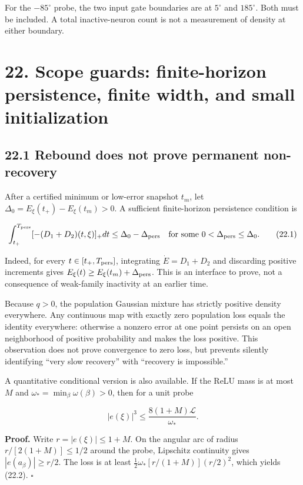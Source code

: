 \documentclass[
  10pt,
]{article}
\begin{document}
For the \(-85^\circ\) probe, the two input gate boundaries are at
\(5^\circ\) and \(185^\circ\). Both must be included. A total
inactive-neuron count is not a measurement of density at either
boundary.

\section{22. Scope guards: finite-horizon persistence, finite width, and
small
initialization}\label{scope-guards-finite-horizon-persistence-finite-width-and-small-initialization}

\subsection{22.1 Rebound does not prove permanent
non-recovery}\label{rebound-does-not-prove-permanent-non-recovery}

After a certified minimum or low-error snapshot \(t_m\), let
\(\Delta_0=E_\xi(t_+)-E_\xi(t_m)>0\). A sufficient finite-horizon
persistence condition is

\[
 \int_{t_+}^{T_{\rm pers}}[-(D_1+D_2)(t,\xi)]_+dt
 \le\Delta_0-\Delta_{\rm pers}
 \quad\text{for some }0<\Delta_{\rm pers}\le\Delta_0.
 \tag{22.1}
\]

Indeed, for every \(t\in[t_+,T_{\rm pers}]\), integrating
\(\dot E=D_1+D_2\) and discarding positive increments gives
\(E_\xi(t)\ge E_\xi(t_m)+\Delta_{\rm pers}\). This is an interface to
prove, not a consequence of weak-family inactivity at an earlier time.

Because \(q>0\), the population Gaussian mixture has strictly positive
density everywhere. Any continuous map with exactly zero population loss
equals the identity everywhere: otherwise a nonzero error at one point
persists on an open neighborhood of positive probability and makes the
loss positive. This observation does not prove convergence to zero loss,
but prevents silently identifying ``very slow recovery'' with ``recovery
is impossible.''

A quantitative conditional version is also available. If the ReLU mass
is at most \(M\) and \(\omega_*=\min_\beta\omega(\beta)>0\), then for a
unit probe

\[
 |e(\xi)|^3\le\frac{8(1+M)\mathcal L}{\omega_*}.
 \tag{22.2}
\]

\textbf{Proof.} Write \(r=|e(\xi)|\le1+M\). On the angular arc of radius
\(r/[2(1+M)]\le1/2\) around the probe, Lipschitz continuity gives
\(|e(a_\beta)|\ge r/2\). The loss is at least
\(\frac12\omega_*[r/(1+M)](r/2)^2\), which yields (22.2). \(\square\)
\end{document}
